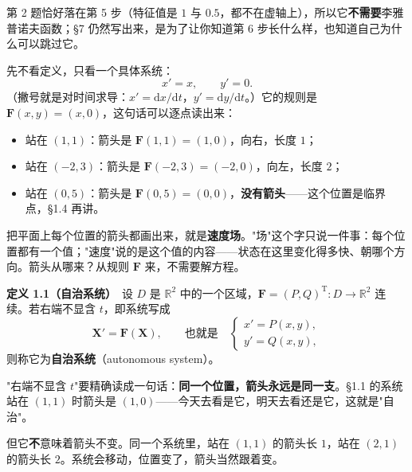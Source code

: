 \documentclass[11pt]{ctexart}
\newcommand{\X}{\mathbf{X}}\newcommand{\Y}{\mathbf{Y}}
\newcommand{\F}{\mathbf{F}}
\begin{document}
第 2 题恰好落在第 5 步（特征值是 $1$ 与 $0.5$，都不在虚轴上），所以它\textbf{不需要}李雅普诺夫函数；§7 仍然写出来，是为了让你知道第 6 步长什么样，也知道自己为什么可以跳过它。



先不看定义，只看一个具体系统：
\[
x'=x,\qquad y'=0 .
\]
（撇号就是对时间求导：$x'=\mathrm{d}x/\mathrm{d}t$，$y'=\mathrm{d}y/\mathrm{d}t$。）它的规则是 $\F(x,y)=(x,0)$，这句话可以逐点读出来：

\begin{itemize}
\item 站在 $(1,1)$：箭头是 $\F(1,1)=(1,0)$，向右，长度 $1$；
\item 站在 $(-2,3)$：箭头是 $\F(-2,3)=(-2,0)$，向左，长度 $2$；
\item 站在 $(0,5)$：箭头是 $\F(0,5)=(0,0)$，\textbf{没有箭头}——这个位置是临界点，§1.4 再讲。
\end{itemize}

把平面上每个位置的箭头都画出来，就是\textbf{速度场}。"场"这个字只说一件事：每个位置都有一个值；"速度"说的是这个值的内容——状态在这里变化得多快、朝哪个方向。箭头从哪来？从规则 $\F$ 来，不需要解方程。


\textbf{定义 1.1（自治系统）}\ 设 $D$ 是 $\mathbb{R}^{2}$ 中的一个区域，$\F=(P,Q)^{\mathrm T}:D\to\mathbb{R}^{2}$ 连续。若右端不显含 $t$，即系统写成
\[
\X'=\F(\X),\qquad\text{也就是}\quad
\begin{cases}
x'=P(x,y),\\[2pt]
y'=Q(x,y),
\end{cases}
\tag{1.1}
\]
则称它为\textbf{自治系统}（autonomous system）。

"右端不显含 $t$"要精确读成一句话：\textbf{同一个位置，箭头永远是同一支}。§1.1 的系统站在 $(1,1)$ 时箭头是 $(1,0)$——今天去看是它，明天去看还是它，这就是"自治"。

但它\textbf{不}意味着箭头不变。同一个系统里，站在 $(1,1)$ 的箭头长 $1$，站在 $(2,1)$ 的箭头长 $2$。系统会移动，位置变了，箭头当然跟着变。

\end{document}
